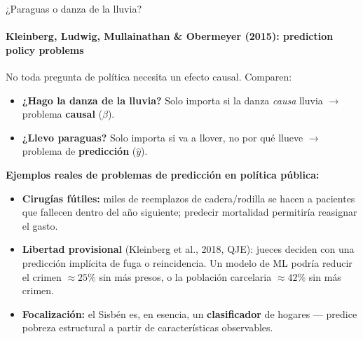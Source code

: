 \documentclass{beamer}
\newcommand{\1}{\mathbb{I}}
\begin{document}
\begin{frame}{¿Paraguas o danza de la lluvia?}
\framesubtitle{Kleinberg, Ludwig, Mullainathan \& Obermeyer (2015): prediction policy problems}
\small
No toda pregunta de política necesita un efecto causal. Comparen: \pause
\begin{itemize}\itemsep5pt
  \item \textbf{¿Hago la danza de la lluvia?} Solo importa si la danza \emph{causa} lluvia $\rightarrow$ problema \textbf{causal} ($\beta$).
  \item \textbf{¿Llevo paraguas?} Solo importa si va a llover, no por qué llueve $\rightarrow$ problema de \textbf{predicción} ($\hat{y}$). \pause
\end{itemize}

\vspace{0.2cm}
\textbf{Ejemplos reales de problemas de predicción en política pública:}
\begin{itemize}\itemsep4pt
  \item \textbf{Cirugías fútiles:} miles de reemplazos de cadera/rodilla se hacen a pacientes que fallecen dentro del año siguiente; predecir mortalidad permitiría reasignar el gasto. \pause
  \item \textbf{Libertad provisional} (Kleinberg et al., 2018, QJE): jueces deciden con una predicción implícita de fuga o reincidencia. Un modelo de ML podría reducir el crimen $\approx 25\%$ sin más presos, o la población carcelaria $\approx 42\%$ sin más crimen. \pause
  \item \textbf{Focalización:} el Sisbén es, en esencia, un \textbf{clasificador} de hogares --- predice pobreza estructural a partir de características observables.
\end{itemize}
\end{frame}
\end{document}
